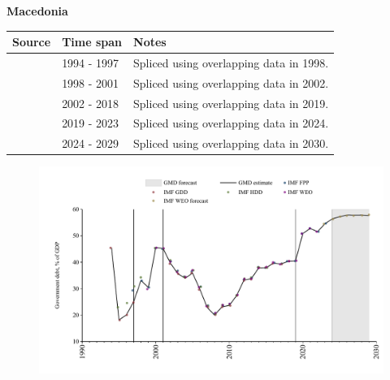\documentclass[12pt,a4paper,landscape]{article}
\begin{document}
\begin{adjustbox}{max totalsize={\paperwidth}{\paperheight},center}
\begin{minipage}[t][\textheight][t]{\textwidth}
\vspace*{0.5cm}
{}
\begin{center}
{\Large\bfseries Macedonia}
\end{center}
\vspace{0.5cm}
\begin{table}[H]
\centering
\small
\begin{tabular}{|l|l|l|}
\hline
\textbf{Source} & \textbf{Time span} & \textbf{Notes} \\
\hline
\rowcolor{white}\cite{IMF_GDD}& 1994 - 1997 &Spliced using overlapping data in 1998.\\
\rowcolor{lightgray}\cite{IMF_FPP}& 1998 - 2001 &Spliced using overlapping data in 2002.\\
\rowcolor{white}\cite{IMF_GDD}& 2002 - 2018 &Spliced using overlapping data in 2019.\\
\rowcolor{lightgray}\cite{IMF_FPP}& 2019 - 2023 &Spliced using overlapping data in 2024.\\
\rowcolor{white}\cite{IMF_WEO_forecast}& 2024 - 2029 &Spliced using overlapping data in 2030.\\
\hline
\end{tabular}
\end{table}
\begin{figure}[H]
\centering
\includegraphics[width=\textwidth,height=0.6\textheight,keepaspectratio]{graphs/MKD_govdebt_GDP.pdf}
\end{figure}
\end{minipage}
\end{adjustbox}
\end{document}
